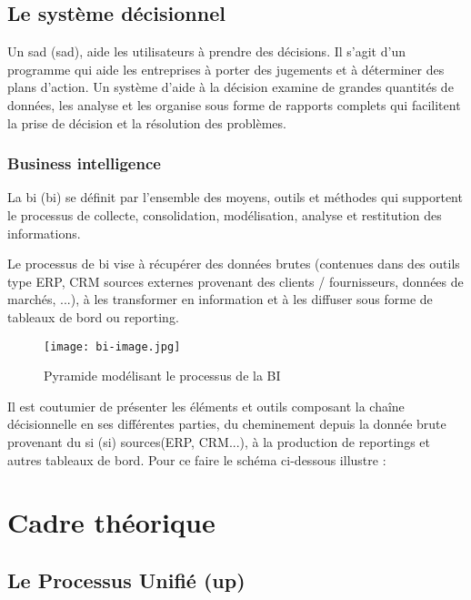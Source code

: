         \subsection[Le système décisionnel]{Le système décisionnel}
        Un \acrlong{sad} (\acrshort{sad}), aide les utilisateurs à prendre des décisions.
        Il s’agit d’un programme qui aide les entreprises à porter des jugements
        et à déterminer des plans d’action.
        Un système d’aide à la décision examine
        de grandes quantités de données, les analyse et les organise sous forme
        de rapports complets qui facilitent la prise de décision et
        la résolution des problèmes. \cite*{SAD}
            \subsubsection[Business intelligence]{Business intelligence}
            La \acrlong{bi} (\acrshort{bi}) se définit par l'ensemble des moyens,
            outils et méthodes qui supportent le processus de collecte, consolidation,
            modélisation, analyse et restitution des informations.
            \par
            Le processus de \acrshort{bi} vise à récupérer des données brutes
            (contenues dans des outils type ERP, CRM sources externes provenant
            des clients / fournisseurs, données de marchés, ...), à les transformer
            en information et à les diffuser sous forme de tableaux
            de bord ou reporting.
            \par
            \begin{figure}[h]
                \centering
                \texttt{[image: bi-image.jpg]}
                \caption{ Pyramide modélisant le processus de la BI}
                \label{fig:pyramideBi}
            \end{figure}
            Il est coutumier de présenter les éléments et outils composant
            la chaîne décisionnelle en ses différentes parties, du cheminement
            depuis la donnée brute provenant du \acrlong{si} (\acrshort{si})
            sources(ERP, CRM...), à la production de reportings et autres tableaux
            de bord. Pour ce faire le schéma ci-dessous illustre :

    \section[Cadre théorique]{Cadre théorique}
        \subsection[La méthode UP]{Le Processus Unifié (\acrshort{up})}
